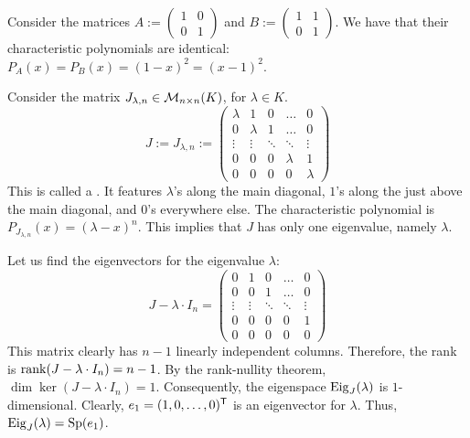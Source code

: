 \begin{example}\label{ex:char_poly_same}
  Consider the matrices $A := \left(\begin{smallmatrix} 1 & 0 \\ 0 & 1 \end{smallmatrix}\right)$ and $B := \left(\begin{smallmatrix} 1 & 1 \\ 0 & 1 \end{smallmatrix}\right)$.
  We have that their characteristic polynomials are identical: $P_A(x) = P_B(x) = (1-x)^2 = (x-1)^2$.
\end{example}

\begin{example}\label{ex:jordan_block_mult}
  Consider the matrix $J_{\lambda, n} \in \mathcal{M}_{n \times n}(K)$, for $\lambda \in K$.
  \begin{equation} \label{eq:jordan_block}
    J := J_{\lambda,n} := \begin{pmatrix} \lambda & 1 & 0 & \dots & 0 \\ 0 & \lambda & 1 & \dots & 0 \\ \vdots & \vdots & \ddots & \ddots & \vdots \\ 0 & 0 & 0 & \lambda & 1 \\ 0 & 0 & 0 & 0 & \lambda \end{pmatrix}
  \end{equation}
  This is called a . It features $\lambda$'s along the main diagonal, $1$'s along the  just above the main diagonal, and $0$'s everywhere else.
  The characteristic polynomial is $P_{J_{\lambda, n}}(x) = (\lambda - x)^n$. This implies that $J$ has only one eigenvalue, namely $\lambda$.

  Let us find the eigenvectors for the eigenvalue $\lambda$:
  \[ J - \lambda \cdot I_n = \begin{pmatrix} 0 & 1 & 0 & \dots & 0 \\ 0 & 0 & 1 & \dots & 0 \\ \vdots & \vdots & \ddots & \ddots & \vdots \\ 0 & 0 & 0 & 0 & 1 \\ 0 & 0 & 0 & 0 & 0 \end{pmatrix} \]
  This matrix clearly has $n-1$ linearly independent columns.
  Therefore, the rank is $\operatorname{rank}(J - \lambda \cdot I_n) = n - 1$.
  By the rank-nullity theorem, $\dim \ker(J - \lambda \cdot I_n) = 1$.
  Consequently, the eigenspace $\operatorname{Eig}_J(\lambda)$ is $1$-dimensional.
  Clearly, $e_1 = (1, 0, \dots, 0)^{\mathsf{T}}$ is an eigenvector for $\lambda$.
  Thus, $\operatorname{Eig}_J(\lambda) = \operatorname{Sp}(e_1)$.
\end{example}

